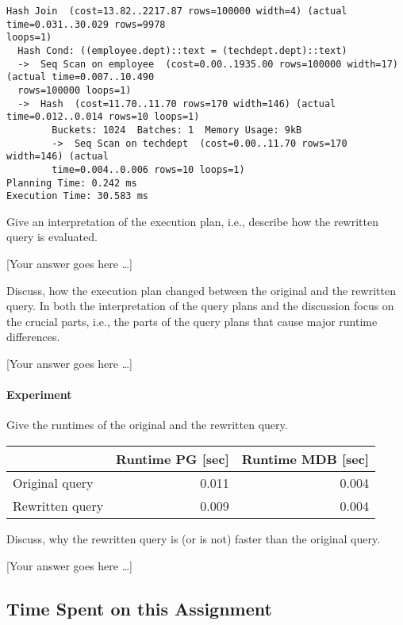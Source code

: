 \documentclass[11pt]{scrartcl}
\newcommand{\youranswerhere}{[Your answer goes here \ldots]}
\begin{document}
            {\small
    \parskip0pt\begin{verbatim}
Hash Join  (cost=13.82..2217.87 rows=100000 width=4) (actual time=0.031..30.029 rows=9978 
loops=1)
  Hash Cond: ((employee.dept)::text = (techdept.dept)::text)
  ->  Seq Scan on employee  (cost=0.00..1935.00 rows=100000 width=17) (actual time=0.007..10.490 
  rows=100000 loops=1)
  ->  Hash  (cost=11.70..11.70 rows=170 width=146) (actual time=0.012..0.014 rows=10 loops=1)
        Buckets: 1024  Batches: 1  Memory Usage: 9kB
        ->  Seq Scan on techdept  (cost=0.00..11.70 rows=170 width=146) (actual 
        time=0.004..0.006 rows=10 loops=1)
Planning Time: 0.242 ms
Execution Time: 30.583 ms
    \end{verbatim}}

    Give an interpretation of the execution plan, i.e., describe how the rewritten query is evaluated.

    \youranswerhere{}

    Discuss, how the execution plan changed between the original and the rewritten query. In both the interpretation of the query plans and the discussion focus on the crucial parts, i.e., the parts of the query plans that cause major runtime differences.

    \youranswerhere{}

    \paragraph{Experiment}

    Give the runtimes of the original and the rewritten query.

    \begin{table}[H]
        \centering
        \begin{tabular}{l|r|r}
            & Runtime PG [sec] & Runtime MDB [sec] \tabularnewline
            \hline
            Original query & 0.011 & 0.004 \tabularnewline
            Rewritten query & 0.009 & 0.004 \tabularnewline
        \end{tabular}
    \end{table}

    Discuss, why the rewritten query is (or is not) faster than the original query.

    \youranswerhere{}

    \subsection*{Time Spent on this Assignment}
\end{document}
